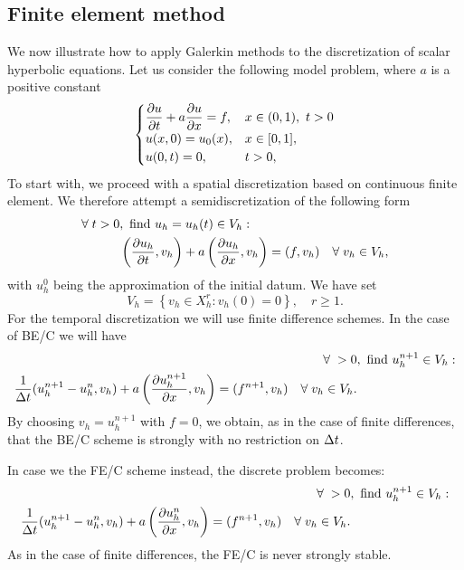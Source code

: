\subsection{Finite element method}
We now illustrate how to apply Galerkin methods to the discretization of scalar hyperbolic equations. Let us consider the following model problem, where \(a\) is a positive constant
\begin{equation}
    \begin{cases}
        \displaystyle \partialderivative{u}{t} + a \partialderivative{u}{x} = f, & x \in (0,1), \ t > 0 \\
        u(x,0) = u_0(x), & x \in [0,1], \\
        u(0,t) = 0, & t > 0,
    \end{cases}
    \label{36_hyp}
\end{equation}
To start with, we proceed with a spatial discretization based on continuous finite element. We therefore attempt a semidiscretization of the following form 
\begin{equation}
    \begin{split}
        \forall \; t > 0&, \ \find u_h = u_h(t) \in V_h : \\
        &\left( \partialderivative{u_h}{t}, v_h \right) + a\left( \partialderivative{u_h}{x}, v_h \right) = (f,v_h) \quad \forall \; v_h \in V_h,
    \end{split}
    \label{37_hyp}
\end{equation}
with \(u_h^0\) being the approximation of the initial datum. We have set 
\[
    V_h = \left\{ v_h \in X_h^r : v_h(0) = 0 \right\}, \quad r \geq 1.
\]
For the temporal discretization we will use finite difference schemes. In the case of BE/C we will have 
\begin{equation}
    \begin{split}
        \forall \; > 0&, \ \find u^{n+1}_h \in V_h : \\
        \frac{1}{\tstep} (u_h^{n+1}- u_h^n, v_h) + a\left( \partialderivative{u_h^{n+1}}{x}, v_h \right) = (f^{n+1}, v_h) \quad \forall \; v_h \in V_h.
    \end{split}
    \label{38_hyp}
\end{equation}
By choosing \(v_h = u_h^{n+1}\) with \(f=0\), we obtain, as in the case of finite differences, that the BE/C scheme is strongly with no restriction on \(\Delta t\). 

In case we the FE/C scheme instead, the discrete problem becomes: 
\begin{equation}
    \begin{split}
        \forall \; > 0&, \ \find u^{n+1}_h \in V_h : \\
        \frac{1}{\tstep} (u_h^{n+1}- u_h^n, v_h) + a\left( \partialderivative{u_h^{n}}{x}, v_h \right) = (f^{n+1}, v_h) \quad \forall \; v_h \in V_h.
    \end{split}
    \label{39_hyp}
\end{equation}
As in the case of finite differences, the FE/C is never strongly stable. 

